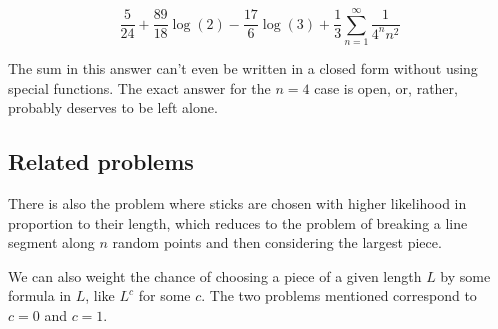 $$\frac{5}{24}+\frac{89}{18}\log(2)-\frac{17}{6}\log(3)+\frac{1}{3}\sum_{n=1}^\infty\frac{1}{4^nn^2}$$

The sum in this answer can't even be written in a closed form without using special functions. The exact answer for the $n=4$ case is open, or, rather, probably deserves to be left alone.

\subsection{Related problems}

There is also the problem where sticks are chosen with higher likelihood in proportion to their length, which reduces to the problem of breaking a line segment along $n$ random points and then considering the largest piece.

We can also weight the chance of choosing a piece of a given length $L$ by some formula in $L$, like $L^c$ for some $c$. The two problems mentioned correspond to $c=0$ and $c=1$.

